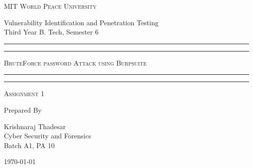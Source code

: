 \documentclass[11pt]{article}
\begin{document}
\begin{titlepage}
    \centering


    \huge\textsc{
        MIT World Peace University
    }\\

    \vspace{0.75\baselineskip} %

    \LARGE{
        Vulnerability Identification and Penetration Testing\\
        Third Year B. Tech, Semester 6
    }

    \vfill %


    \rule{\textwidth}{1.6pt}\vspace*{-\baselineskip}\vspace*{2pt}
    \rule{\textwidth}{0.6pt}
    \vspace{0.75\baselineskip} %



    \huge{\textsc{
            BruteForce password Attack using Burpsuite
        }} \\



    \vspace{0.5\baselineskip} %
    \rule{\textwidth}{0.6pt}\vspace*{-\baselineskip}\vspace*{2.8pt}
    \rule{\textwidth}{1.6pt}

    \vspace{1\baselineskip} %


    \LARGE\textsc{
        Assignment 1
    } %
    \vfill


    Prepared By
    \vspace{0.5\baselineskip} %

    \Large{
        Krishnaraj Thadesar \\
        Cyber Security and Forensics\\
        Batch A1, PA 10
    }


    \vspace{0.5\baselineskip} %
    \today

\end{titlepage}
\end{document}
